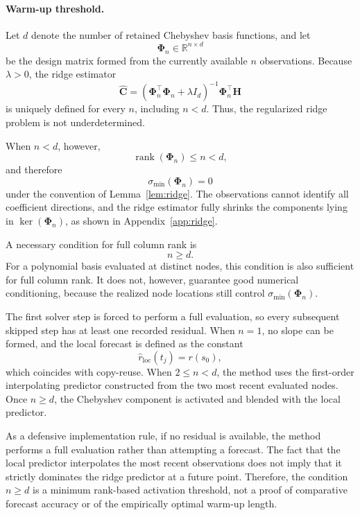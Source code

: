 \paragraph{Warm-up threshold.}
Let $d$ denote the number of retained Chebyshev basis functions, and let
\[
\mathbf{\Phi}_n
\in
\mathbb{R}^{n\times d}
\]
be the design matrix formed from the currently available $n$
observations. Because $\lambda>0$, the ridge estimator
\begin{equation}
\widehat{\mathbf C}
=
\left(
\mathbf{\Phi}_n^\top\mathbf{\Phi}_n+\lambda I_d
\right)^{-1}
\mathbf{\Phi}_n^\top\mathbf H
\label{eq:warmup-ridge-estimator}
\end{equation}
is uniquely defined for every $n$, including $n<d$. Thus, the
regularized ridge problem is not underdetermined.

When $n<d$, however,
\[
\operatorname{rank}(\mathbf{\Phi}_n)
\leq
n
<
d,
\]
and therefore
\begin{equation}
\sigma_{\min}(\mathbf{\Phi}_n)=0
\label{eq:warmup-rank-deficiency}
\end{equation}
under the convention of Lemma~\ref{lem:ridge}. The observations cannot
identify all coefficient directions, and the ridge estimator fully
shrinks the components lying in
$\ker(\mathbf{\Phi}_n)$, as shown in
Appendix~\ref{app:ridge}.

A necessary condition for full column rank is
\begin{equation}
n\geq d.
\label{eq:warmup-dof-condition}
\end{equation}
For a polynomial basis evaluated at distinct nodes, this condition is
also sufficient for full column rank. It does not, however, guarantee
good numerical conditioning, because the realized node locations still
control $\sigma_{\min}(\mathbf{\Phi}_n)$.

The first solver step is forced to perform a full evaluation, so every
subsequent skipped step has at least one recorded residual. When $n=1$,
no slope can be formed, and the local forecast is defined as the
constant
\begin{equation}
\widehat r_{\mathrm{loc}}(t_j)
=
r(s_0),
\label{eq:single-observation-fallback}
\end{equation}
which coincides with copy-reuse. When $2\leq n<d$, the method uses the
first-order interpolating predictor constructed from the two most recent
evaluated nodes. Once $n\geq d$, the Chebyshev component is activated
and blended with the local predictor.

As a defensive implementation rule, if no residual is available, the
method performs a full evaluation rather than attempting a forecast.
The fact that the local predictor interpolates the most recent
observations does not imply that it strictly dominates the ridge
predictor at a future point. Therefore, the condition $n\geq d$ is a
minimum rank-based activation threshold, not a proof of comparative
forecast accuracy or of the empirically optimal warm-up length.

